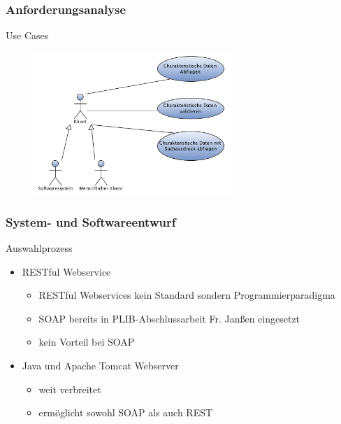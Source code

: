 \documentclass[serif,mathserif]{beamer}
\begin{document}
\begin{frame}
  \frametitle{Anforderungsanalyse}
  Use Cases
    \begin{figure}[t]
    \includegraphics[width=7.5cm]{images/usecases_plib.png}
  \end{figure}
\end{frame}

\begin{frame}
  \frametitle{System- und Softwareentwurf}
  Auswahlprozess
  \begin{itemize}
  \item RESTful Webservice
  	  \begin{itemize}
	  \item RESTful Webservices kein Standard sondern Programmierparadigma
           \item SOAP bereits in PLIB-Abschlussarbeit Fr. Janßen eingesetzt
           \item kein Vorteil bei SOAP
           \end{itemize} 
   \item Java und Apache Tomcat Webserver
  	  \begin{itemize}
           \item weit verbreitet
           \item ermöglicht sowohl SOAP als auch REST
           \end{itemize} 
  \end{itemize}
\end{frame}
\end{document}
